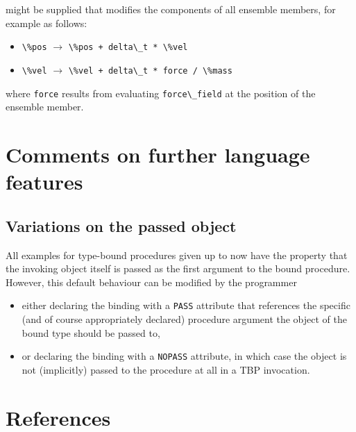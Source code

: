 \documentclass[
  paper=a4,
  ,captions=tableheading
]{scrartcl}
\newcommand{\passthrough}[1]{#1}
\providecommand{\tightlist}{%
  \setlength{\itemsep}{0pt}\setlength{\parskip}{0pt}}
\begin{document}
might be supplied that modifies the components of all ensemble members,
for example as follows:

\begin{itemize}
\tightlist
\item
  \passthrough{\lstinline!\%pos!} \(\longrightarrow\)
  \passthrough{\lstinline!\%pos + delta\_t * \%vel!}
\item
  \passthrough{\lstinline!\%vel!} \(\longrightarrow\)
  \passthrough{\lstinline!\%vel + delta\_t * force / \%mass!}
\end{itemize}

where \passthrough{\lstinline!force!} results from evaluating
\passthrough{\lstinline!force\_field!} at the position of the ensemble
member.

\section{Comments on further language
features}\label{comments-on-further-language-features}

\subsection{Variations on the passed
object}\label{variations-on-the-passed-object}

All examples for type-bound procedures given up to now have the property
that the invoking object itself is passed as the first argument to the
bound procedure. However, this default behaviour can be modified by the
programmer

\begin{itemize}
\tightlist
\item
  either declaring the binding with a \passthrough{\lstinline!PASS!}
  attribute that references the specific (and of course appropriately
  declared) procedure argument the object of the bound type should be
  passed to,
\item
  or declaring the binding with a \passthrough{\lstinline!NOPASS!}
  attribute, in which case the object is not (implicitly) passed to the
  procedure at all in a TBP invocation.
\end{itemize}

\section{References}\label{references}
\end{document}

